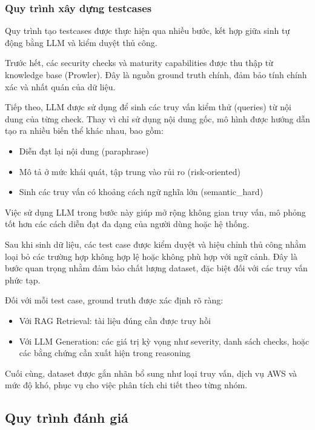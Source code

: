 \subsubsection*{Quy trình xây dựng testcases}

Quy trình tạo testcases được thực hiện qua nhiều bước, kết hợp giữa sinh tự động bằng LLM và kiểm duyệt thủ công.

Trước hết, các security checks và maturity capabilities được thu thập từ knowledge base (Prowler). Đây là nguồn ground truth chính, đảm bảo tính chính xác và nhất quán của dữ liệu.

Tiếp theo, LLM được sử dụng để sinh các truy vấn kiểm thử (queries) từ nội dung của từng check. Thay vì chỉ sử dụng nội dung gốc, mô hình được hướng dẫn tạo ra nhiều biến thể khác nhau, bao gồm:

\begin{itemize}
    \item Diễn đạt lại nội dung (paraphrase)
    \item Mô tả ở mức khái quát, tập trung vào rủi ro (risk-oriented)
    \item Sinh các truy vấn có khoảng cách ngữ nghĩa lớn (semantic\_hard)
\end{itemize}

Việc sử dụng LLM trong bước này giúp mở rộng không gian truy vấn, mô phỏng tốt hơn các cách diễn đạt đa dạng của người dùng hoặc hệ thống.

Sau khi sinh dữ liệu, các test case được kiểm duyệt và hiệu chỉnh thủ công nhằm loại bỏ các trường hợp không hợp lệ hoặc không phù hợp với ngữ cảnh. Đây là bước quan trọng nhằm đảm bảo chất lượng dataset, đặc biệt đối với các truy vấn phức tạp.

Đối với mỗi test case, ground truth được xác định rõ ràng:

\begin{itemize}
    \item Với RAG Retrieval: tài liệu đúng cần được truy hồi
    \item Với LLM Generation: các giá trị kỳ vọng như severity, danh sách checks, hoặc các bằng chứng cần xuất hiện trong reasoning
\end{itemize}

Cuối cùng, dataset được gắn nhãn bổ sung như loại truy vấn, dịch vụ AWS và mức độ khó, phục vụ cho việc phân tích chi tiết theo từng nhóm.


\subsection{Quy trình đánh giá}

